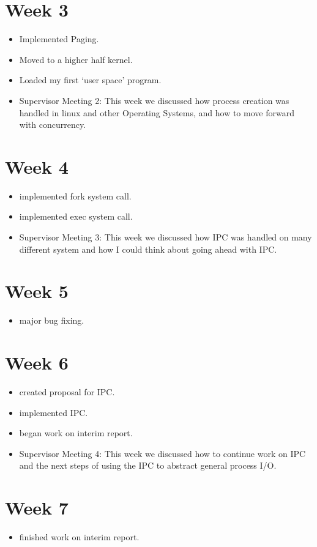\documentclass[a4paper]{report}
\begin{document}
\section*{Week 3}
\begin{itemize}
\item Implemented Paging.
\item Moved to a higher half kernel.
\item Loaded my first `user space' program.
\item Supervisor Meeting 2: This week we discussed how process creation was handled in linux and other Operating Systems, and how to move forward with concurrency.
\end{itemize}

\section*{Week 4}
\begin{itemize}
\item implemented fork system call.
\item implemented exec system call.
\item Supervisor Meeting 3: This week we discussed how IPC was handled on many different system and how I could think about going ahead with IPC.
\end{itemize}

\section*{Week 5}
\begin{itemize}
\item major bug fixing.
\end{itemize}

\section*{Week 6}
\begin{itemize}
\item created proposal for IPC.
\item implemented IPC.
\item began work on interim report.
\item Supervisor Meeting 4: This week we discussed how to continue work on IPC and the next steps of using the IPC to abstract general process I/O.
\end{itemize}

\section*{Week 7}
\begin{itemize}
\item finished work on interim report.
\end{itemize}
\end{document}
